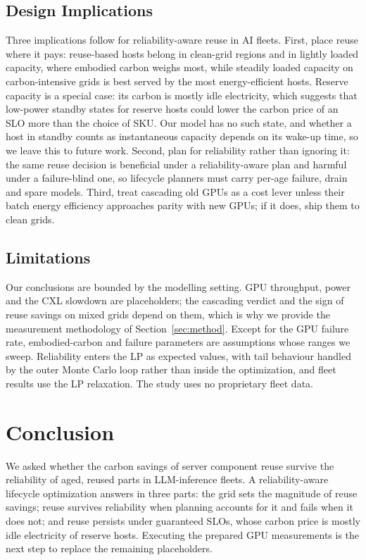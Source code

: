 \documentclass[11pt]{article}
\begin{document}
\subsection{Design Implications}
Three implications follow for reliability-aware reuse in AI fleets. First, place reuse where it pays: reuse-based hosts belong in clean-grid regions and in lightly loaded capacity, where embodied carbon weighs most, while steadily loaded capacity on carbon-intensive grids is best served by the most energy-efficient hosts. Reserve capacity is a special case: its carbon is mostly idle electricity, which suggests that low-power standby states for reserve hosts could lower the carbon price of an SLO more than the choice of SKU. Our model has no such state, and whether a host in standby counts as instantaneous capacity depends on its wake-up time, so we leave this to future work. Second, plan for reliability rather than ignoring it: the same reuse decision is beneficial under a reliability-aware plan and harmful under a failure-blind one, so lifecycle planners must carry per-age failure, drain and spare models. Third, treat cascading old GPUs as a cost lever unless their batch energy efficiency approaches parity with new GPUs; if it does, ship them to clean grids.

\subsection{Limitations}
Our conclusions are bounded by the modelling setting. GPU throughput, power and the CXL slowdown are placeholders; the cascading verdict and the sign of reuse savings on mixed grids depend on them, which is why we provide the measurement methodology of Section~\ref{sec:method}. Except for the GPU failure rate, embodied-carbon and failure parameters are assumptions whose ranges we sweep. Reliability enters the LP as expected values, with tail behaviour handled by the outer Monte Carlo loop rather than inside the optimization, and fleet results use the LP relaxation. The study uses no proprietary fleet data.

\section{Conclusion}
\label{sec:conclusion}
We asked whether the carbon savings of server component reuse survive the reliability of aged, reused parts in LLM-inference fleets. A reliability-aware lifecycle optimization answers in three parts: the grid sets the magnitude of reuse savings; reuse survives reliability when planning accounts for it and fails when it does not; and reuse persists under guaranteed SLOs, whose carbon price is mostly idle electricity of reserve hosts. Executing the prepared GPU measurements is the next step to replace the remaining placeholders.
\end{document}

